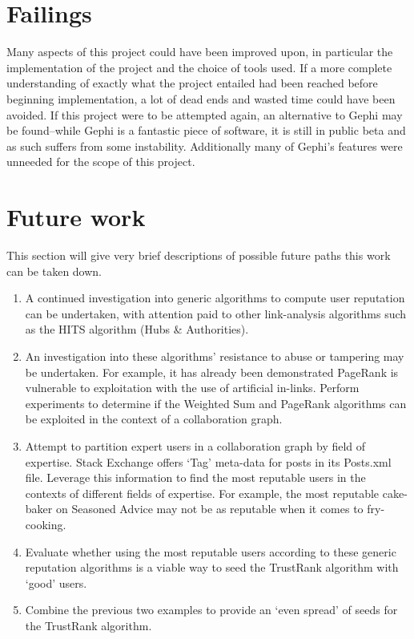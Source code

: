 \documentclass[]{final_report}
\begin{document}
\section{Failings}

Many aspects of this project could have been improved upon, in particular the implementation of the project and the choice of tools used. If a more complete understanding of exactly what the project entailed had been reached before beginning implementation, a lot of dead ends and wasted time could have been avoided. If this project were to be attempted again, an alternative to Gephi may be found--while Gephi is a fantastic piece of software, it is still in public beta and as such suffers from some instability. Additionally many of Gephi's features were unneeded for the scope of this project.

\section{Future work}

This section will give very brief descriptions of possible future paths this work can be taken down.

\begin{enumerate}
\item A continued investigation into generic algorithms to compute user reputation can be undertaken, with attention paid to other link-analysis algorithms such as the HITS algorithm (Hubs \& Authorities).

\item An investigation into these algorithms' resistance to abuse or tampering may be undertaken. For example, it has already been demonstrated PageRank is vulnerable to exploitation with the use of artificial in-links. Perform experiments to determine if the Weighted Sum and PageRank algorithms can be exploited in the context of a collaboration graph.

\item Attempt to partition expert users in a collaboration graph by field of expertise. Stack Exchange offers `Tag' meta-data for posts in its Posts.xml file. Leverage this information to find the most reputable users in the contexts of different fields of expertise. For example, the most reputable cake-baker on Seasoned Advice may not be as reputable when it comes to fry-cooking.

\item Evaluate whether using the most reputable users according to these generic reputation algorithms is a viable way to seed the TrustRank algorithm with `good' users.

\item Combine the previous two examples to provide an `even spread' of seeds for the TrustRank algorithm. 
\end{enumerate}
\end{document}
